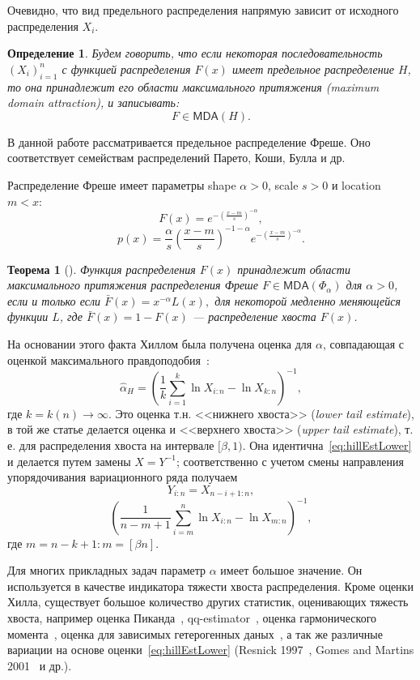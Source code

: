 \documentclass[12pt, specialist, subf, substylefile = spbu.rtx]{disser}
\newtheorem{theorem}{Теорема}
\newtheorem{definition}{Определение}
\newcommand{\MDA}{\mathsf{MDA}}
\begin{document}
Очевидно, что вид предельного распределения напрямую зависит от исходного распределения $X_i$. 
\begin{definition}
Будем говорить, что если некоторая последовательность $(X_i)_{i=1}^n$ с функцией распределения $F(x)$ имеет предельное распределение $H$, то она принадлежит его области максимального притяжения (maximum domain attraction), и записывать:
$$
F \in \MDA(H).
$$
\end{definition}

В данной работе рассматривается предельное распределение Фреше. Оно соответствует семействам распределений Парето, Коши, Булла и др.

Распределение Фреше имеет параметры shape $\alpha>0$, scale $s>0$ и location $m<x$:
$$ F(x)=e^{-(\frac{x-m}{s})^{-\alpha}}, $$
$$ p(x)=\frac{\alpha}{s} \left(\frac{x-m}{s}\right)^{-1-\alpha} e^{-(\frac{x-m}{s})^{-\alpha}}.$$

\begin{theorem}[{\cite[стр.~131]{Embrechts}}]\label{th:freclim}
Функция распределения $F(x)$ принадлежит области максимального притяжения распределения Фреше $F \in \MDA(\Phi_\alpha)$ для $\alpha > 0$, если и только если $\bar{F}(x)=x^{-\alpha}L(x),$ для некоторой медленно меняющейся функции $L$, где $\bar{F}(x)=1-F(x)$ --- распределение хвоста $F(x)$.
\end{theorem}

На основании этого факта Хиллом была получена оценка для $\alpha$, совпадающая с оценкой максимального правдоподобия~\cite{Hill}:
\begin{equation}\label{eq:hillEstLower}
\hat{\alpha}_H=\left(\frac{1}{k} \sum\limits_{i=1}^k \ln X_{i:n}-\ln X_{k:n} \right)^{-1},
\end{equation}
где $k=k(n) \to \infty$. Это оценка т.н. <<нижнего хвоста>> (\textit{lower tail estimate}), в той же статье делается оценка и <<верхнего хвоста>> (\textit{upper tail estimate}), т. е. для распределения хвоста на интервале $[\beta, 1)$. Она идентична~\eqref{eq:hillEstLower} и делается путем замены $X=Y^{-1}$; соответственно с учетом смены направления упорядочивания вариационного ряда получаем 
$$
Y_{i:n}=X_{n-i+1:n},
$$
\begin{equation}\label{eq:hillEst}
\left(\frac{1}{n-m+1} \sum\limits_{i=m}^n \ln X_{i:n}-\ln X_{m:n} \right)^{-1},
\end{equation}
где $m=n-k+1 : m=[\beta n]$.

Для многих прикладных задач параметр $\alpha$ имеет большое значение. 
Он используется в качестве индикатора тяжести хвоста распределения. Кроме оценки Хилла, существует большое количество других статистик, оценивающих тяжесть хвоста, например оценка Пиканда~\cite{iii1975}, qq-estimator~\cite{kratz1995}, оценка гармонического момента~\cite{henry2009}, оценка для зависимых гетерогенных даных~\cite{hill2010}, а так же различные вариации на основе оценки~\eqref{eq:hillEstLower} (Resnick 1997~\cite{resnick1998}, Gomes and Martins 2001~\cite{Gomes2001} и др.).
\end{document}

